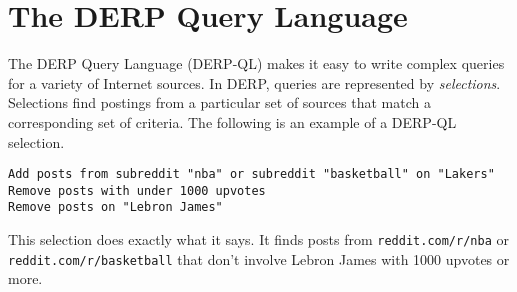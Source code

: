 \documentclass{article}
\begin{document}
\newpage
\section{\textbf{The DERP Query Language}}
The DERP Query Language (DERP-QL) makes it easy to write complex queries for a variety of Internet sources. In DERP, queries are represented by \textit{selections}. Selections find postings from a particular set of sources that match a corresponding set of criteria. The following is an example of a DERP-QL selection.

\begin{lstlisting}
Add posts from subreddit "nba" or subreddit "basketball" on "Lakers"
Remove posts with under 1000 upvotes
Remove posts on "Lebron James"
\end{lstlisting}

This selection does exactly what it says. It finds posts from \texttt{reddit.com/r/nba} or \\ \texttt{reddit.com/r/basketball} that don't involve Lebron James with 1000 upvotes or more.






\end{document}
